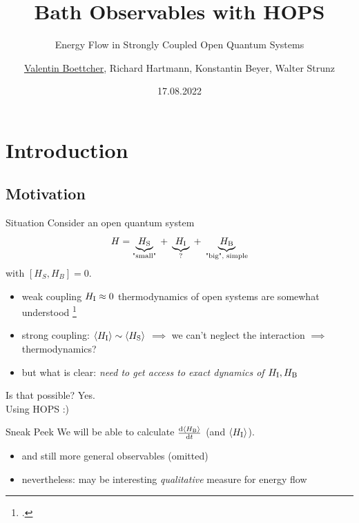 \documentclass[10pt, aspectratio=169]{beamer}
\institute[TUD] %
{
  TU Dresden
}
\title{Bath Observables with HOPS}
\subtitle{Energy Flow in Strongly Coupled Open Quantum Systems}
\author{\underline{Valentin Boettcher}, Richard Hartmann,
  Konstantin Beyer, Walter Strunz}
\institute{Institute for Theoretical Physics, Dresden, Germany}
\date{17.08.2022}
\begin{document}
\hypersetup{pageanchor=false}
\begin{frame}[plain]
  \titlepage
\end{frame}

\begin{frame}
  \tableofcontents
\end{frame}


\section{Introduction}
\label{sec:intro}

\subsection{Motivation}

\begin{frame}
  \begin{block}{Situation}
    Consider an open quantum system
    \begin{equation}
      \label{eq:openthermo}
      H=\underbrace{H_{\mathrm{S}}}_{\text{"small"}}\; +\;
      \underbrace{H_{\mathrm{I}}}_{\mathrm{?}} \;+\;
      \underbrace{H_{\mathrm{B}}}_{\text{"big", simple}}
    \end{equation}
    with \([H_S, H_B] = 0\).
  \end{block}
  \pause
  \begin{itemize}[<+->]
  \item weak coupling \(H_{\mathrm{I}}\approx 0\)
    thermodynamics of open systems
    are somewhat understood \footcite{Rivas2019Oct,Talkner2020Oct}
  \item strong coupling: \(\ev{H_\inter} \sim \ev{H_\sys}\)
    \(\implies\) we can't neglect the interaction \(\implies\)
    thermodynamics?
  \item but what is clear: \emph{need to get access to exact dynamics
      of \(H_{\mathrm{I}},H_{\mathrm{B}}\)}
  \end{itemize}
\end{frame}
\begin{frame}
  \begin{center}
    \huge{Is that possible? \pause{}Yes.}\\\pause{}
    \huge{Using HOPS :)}
    \pause{}
  \end{center}
  \begin{block}{Sneak Peek}
      We will be able to calculate
      \(\dv{\ev{H_\bath}}{t}\) (and \(\ev{H_\inter}\)).
      \begin{itemize}
      \item and still more general observables (omitted)
      \end{itemize}
  \end{block}
  \pause{}
  \begin{itemize}[<+->]
  \item nevertheless: may be interesting \emph{qualitative} measure
    for energy flow
  \end{itemize}
\end{frame}
\end{document}
